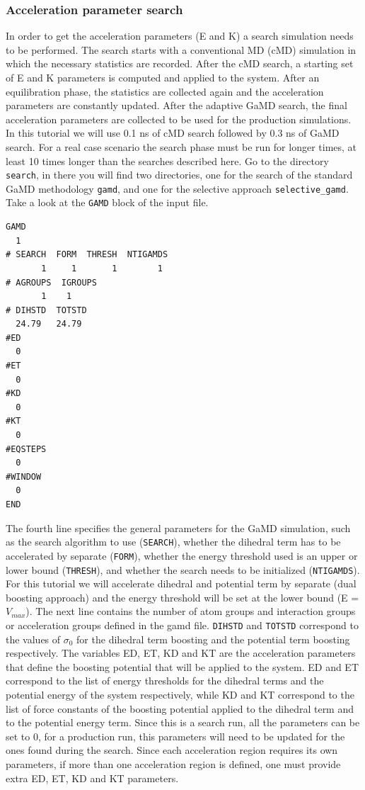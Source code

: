 \subsubsection{Acceleration parameter search}
In order to get the acceleration parameters (E and K) a search simulation needs to be performed. The search starts with a conventional MD (cMD) simulation in which the necessary statistics are recorded. After the cMD search, a starting set of E and K parameters is computed and applied to the system. After an equilibration phase, the statistics are collected again and the acceleration parameters are constantly updated. After the adaptive GaMD search, the final acceleration parameters are collected to be used for the production simulations. In this tutorial we will use 0.1 ns of cMD search followed by 0.3 ns of GaMD search. For a real case scenario the search phase must be run for longer times, at least 10 times longer than the searches described here.
Go to the directory \texttt{search}, in there you will find two directories, one for the search of the standard GaMD methodology \texttt{gamd}, and one for the selective approach \texttt{selective\_gamd}. Take a look at the \texttt{GAMD} block of the input file.
\begin{lstlisting}
GAMD
  1
# SEARCH  FORM  THRESH  NTIGAMDS
       1     1       1        1
# AGROUPS  IGROUPS
       1    1
# DIHSTD  TOTSTD
  24.79   24.79
#ED
  0
#ET
  0
#KD
  0
#KT
  0
#EQSTEPS
  0
#WINDOW
  0
END
\end{lstlisting}
The fourth line specifies the general parameters for the GaMD simulation, such as the search algorithm to use (\texttt{SEARCH}), whether the dihedral term has to be accelerated by separate (\texttt{FORM}), whether the energy threshold used is an upper or lower bound (\texttt{THRESH}), and whether the search needs to be initialized (\texttt{NTIGAMDS}). For this tutorial we will accelerate dihedral and potential term by separate (dual boosting approach) and the energy threshold will be set at the lower bound (E = $V_{max}$). 
The next line contains the number of atom groups and interaction groups or acceleration groups defined in the gamd file.
\texttt{DIHSTD} and \texttt{TOTSTD} correspond to the values of $\sigma_0$ for the dihedral term boosting and the potential term boosting respectively.  
The variables ED, ET, KD and KT are the acceleration parameters that define the boosting potential that will be applied to the system. ED and ET correspond to the list of energy thresholds for the dihedral terms and the potential energy of the system respectively, while KD and KT correspond to the list of force constants of the boosting potential applied to the dihedral term and to the potential energy term. Since this is a search run, all the parameters can be set to 0, for a production run, this parameters will need to be updated for the ones found during the search. Since each acceleration region requires its own parameters, if more than one acceleration region is defined, one must provide extra ED, ET, KD and KT parameters.
